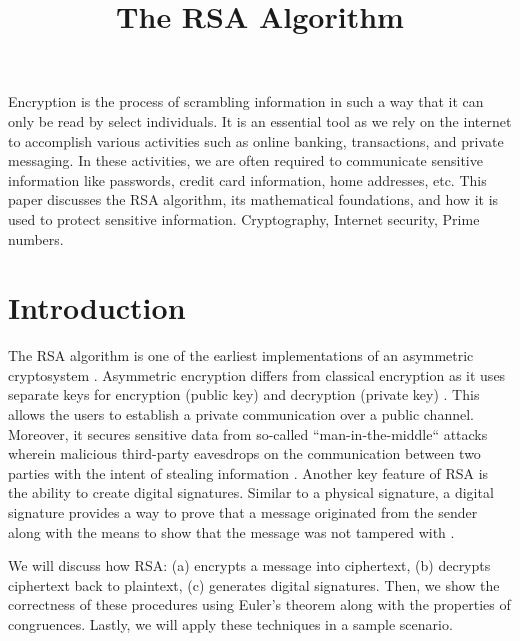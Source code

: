 \documentclass[10pt]{article}
\begin{document}
\noindent



\title{The RSA Algorithm}


\maketitle


\abstract
Encryption is the process of scrambling information in such a way that it can only be read by select individuals. It is an essential tool as we rely on the internet to accomplish various activities such as online banking, transactions, and private messaging. In these activities, we are often required to communicate sensitive information like passwords, credit card information, home addresses, etc. This paper discusses the RSA algorithm, its mathematical foundations, and how it is used to protect sensitive information.
\keywords
Cryptography, Internet security, Prime numbers.


\section{Introduction}
The RSA algorithm is one of the earliest implementations of an asymmetric cryptosystem \cite{rivest1978method}. Asymmetric encryption differs from classical encryption as it uses separate keys for encryption (public key) and decryption (private key) \cite{diffie1976new}. This allows the users to establish a private communication over a public channel. Moreover, it secures sensitive data from so-called “man-in-the-middle“ attacks wherein malicious third-party eavesdrops on the communication between two parties with the intent of stealing information \cite{stallings1999cryptography}. Another key feature of RSA is the ability to create digital signatures. Similar to a physical signature, a digital signature provides a way to prove that a message originated from the sender along with the means to show that the message was not tampered with \cite{diffie1976new}. 

We will discuss how RSA: (a) encrypts a message into ciphertext, (b) decrypts ciphertext back to plaintext, (c) generates digital signatures. Then, we show the correctness of these procedures using Euler’s theorem along with the properties of congruences. Lastly, we will apply these techniques in a sample scenario.
\end{document}
